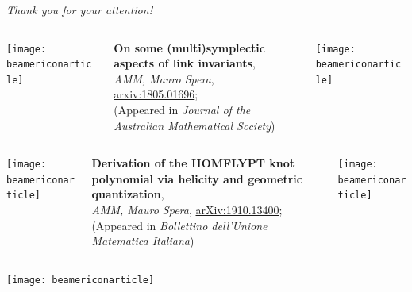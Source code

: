 \documentclass[handout,10pt]{beamer}
\begin{document}
	\begin{frame}{}
		\vfill
	  \centering 
	  {\Huge\color{red} 
	  \emph{Thank you for your attention!}}
		\vfill
		\centering
		\begin{columns}
			\hfill
			\begin{column}{0.05\linewidth}
				\centering \texttt{[image: beamericonarticle]}
			\end{column}
			\begin{column}{0.8\linewidth}
				\centering
				\textbf{On some (multi)symplectic aspects of link invariants},
				\\
				\emph{AMM, Mauro Spera}, \href{https://arXiv.org/abs/1805.01696}{arxiv:1805.01696};\\
				(Appeared in \emph{Journal of the Australian Mathematical Society})	
			\end{column}
			\begin{column}{0.05\linewidth}
				\centering \texttt{[image: beamericonarticle]}			
			\end{column}
			\hfill
		\end{columns}
		\vfill
		\begin{columns}
			\hfill
			\begin{column}{0.05\linewidth}
				\centering \texttt{[image: beamericonarticle]}
			\end{column}
			\begin{column}{0.8\linewidth}
				\centering
		\textbf{Derivation of the HOMFLYPT knot polynomial via helicity and geometric quantization},
				\\
		\emph{AMM, Mauro Spera}, \href{https://arxiv.org/abs/1910.13400}{arXiv:1910.13400};\\
				(Appeared in \emph{Bollettino dell'Unione Matematica Italiana})	
			\end{column}				
			\begin{column}{0.05\linewidth}
				\centering \texttt{[image: beamericonarticle]}			
			\end{column}
			\hfill
		\end{columns}
		\vfill
		\begin{columns}
			\hfill
			\begin{column}{0.05\linewidth}
				\centering \texttt{[image: beamericonarticle]}
			\end{column}

\end{columns}
\end{frame}
\end{document}
